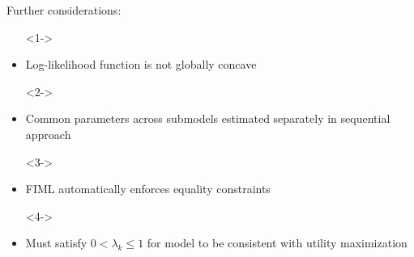 \documentclass[aspectratio=169]{beamer}
\begin{document}
\begin{frame}

\bigskip{}


\end{frame}

\begin{frame}

Further considerations:

\begin{itemize}
\item[]<1->
\item<1-> Log-likelihood function is not globally concave
\item[]<2->
\item<2-> Common parameters across submodels estimated separately in sequential approach
\item[]<3->
\item<3-> FIML automatically enforces equality constraints
\item[]<4->
\item<4-> Must satisfy $0 < \lambda_k \leq 1$ for model to be consistent with utility maximization
\end{itemize}


\end{frame}
\end{document}
